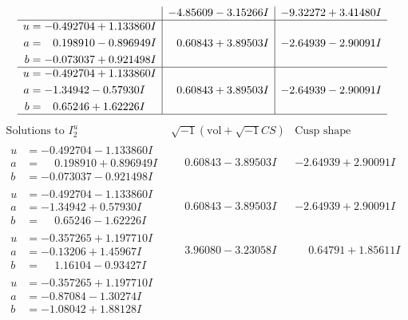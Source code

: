 \documentclass[1p]{elsarticle_modified}
\theoremstyle{definition}
\newcommand{\I}{\sqrt{-1}}
\begin{document}
$$\begin{array}{c|c|c}
 & -4.85609 - 3.15266 I & -9.32272 + 3.41480 I \\ \hline\begin{aligned}
u &= -0.492704 + 1.133860 I \\
a &= \phantom{-}0.198910 - 0.896949 I \\
b &= -0.073037 + 0.921498 I\end{aligned}
 & \phantom{-}0.60843 + 3.89503 I & -2.64939 - 2.90091 I \\ \hline\begin{aligned}
u &= -0.492704 + 1.133860 I \\
a &= -1.34942 - 0.57930 I \\
b &= \phantom{-}0.65246 + 1.62226 I\end{aligned}
 & \phantom{-}0.60843 + 3.89503 I & -2.64939 - 2.90091 I\\
 \hline 
 \end{array}$$\newpage$$\begin{array}{c|c|c}  
\text{Solutions to }I^u_{2}& \I (\text{vol} + \sqrt{-1}CS) & \text{Cusp shape}\\
 \hline 
\begin{aligned}
u &= -0.492704 - 1.133860 I \\
a &= \phantom{-}0.198910 + 0.896949 I \\
b &= -0.073037 - 0.921498 I\end{aligned}
 & \phantom{-}0.60843 - 3.89503 I & -2.64939 + 2.90091 I \\ \hline\begin{aligned}
u &= -0.492704 - 1.133860 I \\
a &= -1.34942 + 0.57930 I \\
b &= \phantom{-}0.65246 - 1.62226 I\end{aligned}
 & \phantom{-}0.60843 - 3.89503 I & -2.64939 + 2.90091 I \\ \hline\begin{aligned}
u &= -0.357265 + 1.197710 I \\
a &= -0.13206 + 1.45967 I \\
b &= \phantom{-}1.16104 - 0.93427 I\end{aligned}
 & \phantom{-}3.96080 - 3.23058 I & \phantom{-}0.64791 + 1.85611 I \\ \hline\begin{aligned}
u &= -0.357265 + 1.197710 I \\
a &= -0.87084 - 1.30274 I \\
b &= -1.08042 + 1.88128 I\end{aligned}

\end{array}$$
\end{document}
